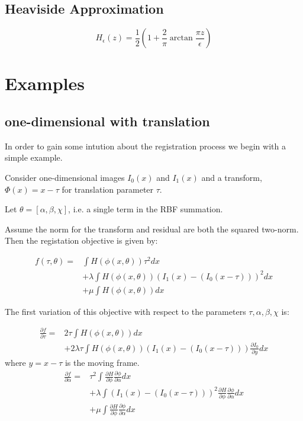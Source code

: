 \documentclass[preprint,review,12pt]{elsarticle}
\begin{document}
\subsection{Heaviside Approximation}

\[
H_\epsilon(z) = \frac{1}{2} \left (  1 + \frac{2}{\pi}
  \arctan{\frac{\pi z}{\epsilon}} \right )
\]

\section{Examples}

\subsection{one-dimensional with translation }
In order to gain some intution about the registration process we begin
with a simple example.
\par
Consider one-dimensional images $I_0(x)$ and $I_1(x)$ and a
transform, $\Phi(x) = x - \tau$ for translation parameter $\tau$.
\par
Let $\theta = [\alpha, \beta, \chi]$, i.e. a single term in the RBF
summation.
\par
Assume the norm for the transform and residual are both the squared two-norm.
Then the registation objective is given by:

\begin{eqnarray*}
f(\tau,\theta) = & \int H(\phi(x,\theta)) \tau^2 dx \\
& + \lambda \int H(\phi(x,\theta))\left (I_1(x) - (I_0(x-\tau)) \right )^2dx \\
& + \mu \int H(\phi(x,\theta)) dx
\end{eqnarray*}

The first variation of this objective with respect to the parameters
$\tau, \alpha, \beta, \chi$ is:

\begin{eqnarray*}
\frac{\partial f}{\partial \tau} = & 2\tau\int H(\phi(x,\theta)) dx \\
& + 2\lambda\tau \int H(\phi(x,\theta))\left (I_1(x) - (I_0(x-\tau))
\right )\frac{\partial I_0}{\partial y} dx
\end{eqnarray*}
where $y = x - \tau$ is the moving frame.
\begin{eqnarray*}
\frac{\partial f}{\partial \alpha} = & \tau^2\int \frac{\partial
  H}{\partial \phi}\frac{\partial \phi}{\partial \alpha} dx \\
& + \lambda \int \left (I_1(x) - (I_0(x-\tau)) \right )^2 \frac{\partial
  H}{\partial \phi}\frac{\partial \phi}{\partial \alpha} dx \\
& + \mu \int \frac{\partial
  H}{\partial \phi}\frac{\partial \phi}{\partial \alpha} dx
\end{eqnarray*}
\end{document}
